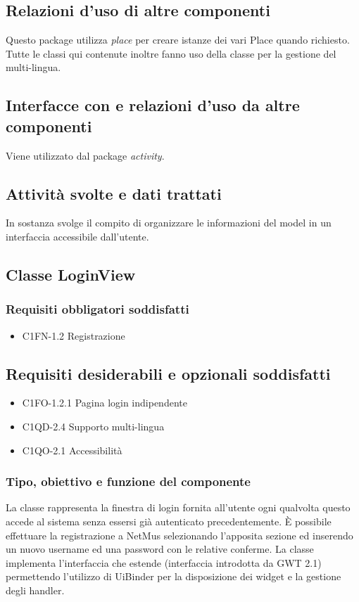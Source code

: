 \subsection*{Relazioni
d'uso di altre componenti} Questo package utilizza \emph{place} per creare istanze dei vari Place quando richiesto.
Tutte le classi qui contenute inoltre fanno uso della classe 
per la gestione del multi-lingua. 
\subsection*{Interfacce con e relazioni d'uso
da altre componenti} Viene utilizzato dal package \emph{activity}.
\subsection*{Attivit\`a svolte e dati trattati}
In sostanza svolge il compito di organizzare le informazioni del model in un
interfaccia accessibile dall'utente.

\subsection{Classe LoginView}
\subsubsection*{Requisiti obbligatori soddisfatti}
\begin{itemize}
	\item C1FN-1.2 Registrazione
\end{itemize}
\subsection*{Requisiti desiderabili e opzionali soddisfatti}
\begin{itemize}
    \item C1FO-1.2.1 Pagina login indipendente
    \item C1QD-2.4 Supporto multi-lingua
    \item C1QO-2.1 Accessibilit\`a
\end{itemize}
\subsubsection*{Tipo, obiettivo e funzione del componente}
La classe  rappresenta la finestra di login fornita all'utente
ogni qualvolta questo accede al sistema senza essersi gi\`a autenticato
precedentemente. \`E possibile effettuare la registrazione a NetMus
selezionando l'apposita sezione ed inserendo un nuovo username ed una password
con le relative conferme. La classe  implementa l'interfaccia
 che estende  (interfaccia introdotta da GWT 2.1)
permettendo l'utilizzo di UiBinder per la disposizione dei widget e la gestione
degli handler. 
